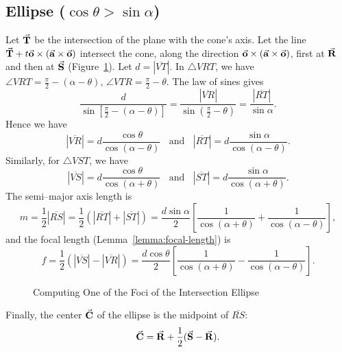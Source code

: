 \subsection{Ellipse ($\cos\theta>\sin\alpha$)}
\label{section:ellipse}

Let $\vec{\bf T}$ be the intersection of the plane with the cone's axis.
Let the line $\vec{\bf T}+t\vec{\bf o}\times(\vec{\bf a}\times\vec{\bf o})$
intersect the cone, along the direction 
$\vec{\bf o}\times(\vec{\bf a}\times\vec{\bf o})$, first at $\vec{\bf R}$ and then at
$\vec{\bf S}$ (Figure~\ref{fig:ellipse}).  
Let $d=|\overline{VT}|$.
In $\bigtriangleup VRT$, we have $\angle VRT=\frac{\pi}{2}-(\alpha-\theta)$,
$\angle VTR=\frac{\pi}{2}-\theta$.  The law of sines gives
\[ \frac{d}{\sin\left[\frac{\pi}{2}-(\alpha-\theta)\right]} =
   \frac{|\overline{VR}|}{\sin\left(\frac{\pi}{2}-\theta\right)} =
   \frac{|\overline{RT}|}{\sin\alpha}. \]
Hence we have
\[ |\overline{VR}|=d\frac{\cos\theta}{\cos(\alpha-\theta)}\ \ \ \ \mbox{and}
     \ \ \ \ |\overline{RT}|=d\frac{\sin\alpha}{\cos(\alpha-\theta)}. \]
Similarly, for $\bigtriangleup VST$, we have
\[ |\overline{VS}|=d\frac{\cos\theta}{\cos(\alpha+\theta)}\ \ \ \ \mbox{and}
     \ \ \ \ |\overline{ST}|=d\frac{\sin\alpha}{\cos(\alpha+\theta)}. \]
The semi--major axis length is
\begin{equation}
\label{eqn:RS}
 m=\frac{1}{2}|\overline{RS}|
  =\frac{1}{2}(|\overline{RT}| + |\overline{ST}|)
  =\frac{d\sin\alpha}{2}\left[ \frac{1}{\cos(\alpha+\theta)}+
                    \frac{1}{\cos(\alpha-\theta)}\right],
\end{equation}
and the focal length (Lemma~\ref{lemma:focal-length}) is
\begin{equation}
\label{eqn:f}
 f= \frac{1}{2}(|\overline{VS}| - |\overline{VR}|)
  = \frac{d\cos\theta}{2}\left[ \frac{1}{\cos(\alpha+\theta)}-
                                 \frac{1}{\cos(\alpha-\theta)}\right].
\end{equation}

\begin{figure}
\vspace{5cm}
\caption{Computing One of the Foci of the Intersection Ellipse}
\label{fig:ellipse}
\end{figure}

     Finally, the center $\vec{\bf C}$ of the ellipse is
the midpoint of $\overline{RS}$:
\begin{equation}
\label{eqn:center}
     \vec{\bf C}=\vec{\bf R}+\frac{1}{2}(\vec{\bf S}-\vec{\bf R}).
\end{equation}

